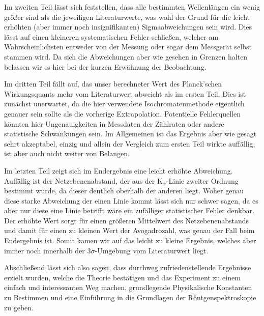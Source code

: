 \documentclass{article}
\begin{document}
Im zweiten Teil lässt sich feststellen, dass alle bestimmten Wellenlängen ein wenig größer sind als die jeweiligen Literaturwerte, was wohl der Grund für die leicht erhöhten (aber immer noch insignifikanten) Sigmaabweichungen sein wird. Dies lässt auf einen kleineren systematischen Fehler schließen, welcher am Wahrscheinlichsten entweder von der Messung oder sogar dem Messgerät selbst stammen wird. Da sich die Abweichungen aber wie gesehen in Grenzen halten belassen wir es hier bei der kurzen Erwähnung der Beobachtung.

Im dritten Teil fällt auf, das unser berechneter Wert des Planck'schen Wirkungsquants mehr vom Literaturwert abweicht als im ersten Teil. Dies ist zunächst unerwartet, da die hier verwendete Isochromatenmethode eigentlich genauer sein sollte als die vorherige Extrapolation. Potentielle Fehlerquellen könnten hier Ungenauigkeiten in Messdaten der Zählraten oder andere statistische Schwankungen sein. Im Allgemeinen ist das Ergebnis aber wie gesagt sehrt akzeptabel, einzig und allein der Vergleich zum ersten Teil wirkte auffällig, ist aber auch nicht weiter von Belangen.

Im letzten Teil zeigt sich im Endergebnis eine leicht erhöhte Abweichung. Auffällig ist der Netzebenenabstand, der aus der K$_\alpha$-Linie zweiter Ordnung bestimmt wurde, da dieser deutlich oberhalb der anderen liegt. Woher genau diese starke Abweichung der einen Linie kommt lässt sich nur schwer sagen, da es aber nur diese eine Linie betrifft wäre ein zufälliger statistischer Fehler denkbar. Der erhöhte Wert sorgt für einen größeren Mittelwert des Netzebenenabstands und damit für einen zu kleinen Wert der Avogadrozahl, was genau der Fall beim Endergebnis ist. Somit kamen wir auf das leicht zu kleine Ergebnis, welches aber immer noch innerhalb der $3\sigma$-Umgebung vom Literaturwert liegt.

Abschließend lässt sich also sagen, dass durchweg zufriedenstellende Ergebnisse erzielt wurden, welche die Theorie bestätigen und das Experiment zu einem einfach und interessanten Weg machen, grundlegende Physikalische Konstanten zu Bestimmen und eine Einführung in die Grundlagen der Röntgenspektroskopie zu geben. 



\newpage

\end{document}
